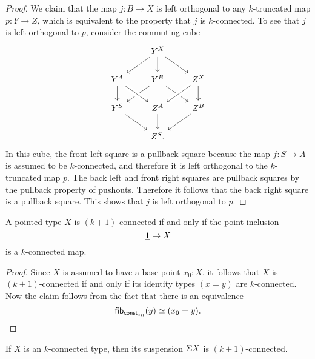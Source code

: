 \begin{proof}
  We claim that the map $j:B\to X$ is left orthogonal to any $k$-truncated map $p:Y\to Z$, which is equivalent to the property that $j$ is $k$-connected. To see that $j$ is left orthogonal to $p$, consider the commuting cube
  \begin{equation*}
    \begin{tikzcd}
      & Y^X \arrow[dl] \arrow[d] \arrow[dr] & \\
      Y^A \arrow[d] & Y^B \arrow[dl] \arrow[dr] & Z^X \arrow[dl,crossing over] \arrow[d] \\
      Y^S \arrow[dr] & Z^A \arrow[d] \arrow[from=ul,crossing over] & Z^B \arrow[dl] \\
      & Z^S.
    \end{tikzcd}
  \end{equation*}
  In this cube, the front left square is a pullback square because the map $f:S\to A$ is assumed to be $k$-connected, and therefore it is left orthogonal to the $k$-truncated map $p$. The back left and front right squares are pullback squares by the pullback property of pushouts. Therefore it follows that the back right square is a pullback square. This shows that $j$ is left orthogonal to $p$.
\end{proof}

\begin{lem}\label{lem:conn-mismatch}
  A pointed type $X$ is $(k+1)$-connected if and only if the point inclusion
  \begin{equation*}
    \underline{\mathbf{1}}\to X
  \end{equation*}
  is a $k$-connected map.
\end{lem}

\begin{proof}
  Since $X$ is assumed to have a base point $x_0:X$, it follows that $X$ is $(k+1)$-connected if and only if its identity types $(x=y)$ are $k$-connected. Now the claim follows from the fact that there is an equivalence
  \begin{equation*}
    \mathsf{fib}_{\mathsf{const}_{x_0}}(y)\simeq (x_0=y).\qedhere
  \end{equation*}
\end{proof}

\begin{thm}\label{thm:conn-suspension}
  If $X$ is an $k$-connected type, then its suspension $\Sigma X$ is $(k+1)$-connected.
\end{thm}

